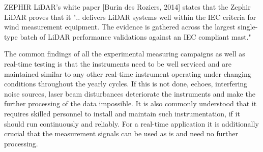 ZEPHIR LiDAR's white paper [Burin des Roziers, 2014] states that the Zephir LiDAR proves that it ".. delivers LiDAR systems well within the IEC criteria for wind  measurement  equipment. The  evidence  is gathered  across  the  largest single-type batch  of  LiDAR performance  validations against  an IEC compliant mast."

The common findings of all the experimental measuring campaigns as well as real-time testing is that the instruments need to be well serviced and are maintained similar to any other real-time instrument operating under changing conditions throughout the yearly cycles. 
If this is not done, echoes, interfering noise sources, laser beam disturbances deteriorate the instruments and make the further processing of the data impossible. 
It is also commonly understood that it requires skilled personnel to install and maintain such instrumentation, if it should run continuously and reliably. For a real-time application it is additionally crucial that the measurement signals can be used as is and need no further processing.



